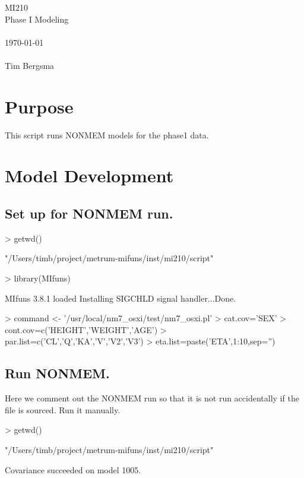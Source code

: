 
\usepackage{Sweave}

 

\vspace*{2cm}
\begin{center}
{\Huge MI210}\\
\vspace{1.5cm}
{\Large Phase I Modeling}\\
~\\
\today\\
~\\
Tim Bergsma\\
\end{center}
\newpage

\section{Purpose}
This script runs NONMEM models for the phase1 data.
\section{Model Development}
\subsection{Set up for NONMEM run.}
\begin{Schunk}
\begin{Sinput}
> getwd()
\end{Sinput}
\begin{Soutput}
[1] "/Users/timb/project/metrum-mifuns/inst/mi210/script"
\end{Soutput}
\begin{Sinput}
> library(MIfuns)
\end{Sinput}
\begin{Soutput}
MIfuns 3.8.1 loaded
Installing SIGCHLD signal handler...Done.
\end{Soutput}
\begin{Sinput}
> command <- '/usr/local/nm7_osxi/test/nm7_osxi.pl'
> cat.cov='SEX'
> cont.cov=c('HEIGHT','WEIGHT','AGE')
> par.list=c('CL','Q','KA','V','V2','V3')
> eta.list=paste('ETA',1:10,sep='')
\end{Sinput}
\end{Schunk}
\subsection{Run NONMEM.}
Here we comment out the NONMEM run so that it is not run accidentally 
if the file is sourced.  Run it manually.
\begin{Schunk}
\begin{Sinput}
> getwd()
\end{Sinput}
\begin{Soutput}
[1] "/Users/timb/project/metrum-mifuns/inst/mi210/script"
\end{Soutput}
\end{Schunk}
Covariance succeeded on model 1005.
